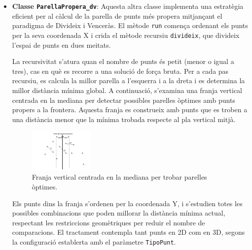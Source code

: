 \documentclass{ieeetj}
\begin{document}
\begin{itemize}
\item \textbf{Classe \texttt{ParellaPropera\_dv}}: Aquesta altra classe implementa una estratègia eficient per al càlcul de la parella de punts més propera mitjançant el paradigma de Divideix i Venceràs. El mètode \texttt{run} comença ordenant els punts per la seva coordenada X i crida el mètode recursiu \texttt{divideix}, que divideix l'espai de punts en dues meitats. 

La recursivitat s'atura quan el nombre de punts és petit (menor o igual a tres), cas en què es recorre a una solució de força bruta. Per a cada pas recursiu, es calcula la millor parella a l'esquerra i a la dreta i es determina la millor distància mínima global. A continuació, s'examina una franja vertical centrada en la mediana per detectar possibles parelles òptimes amb punts propers a la frontera. Aquesta franja es construeix amb punts que es troben a una distància menor que la mínima trobada respecte al pla vertical mitjà.

\begin{figure}[htbp]
    \centerline{\includegraphics[width=0.3\textwidth]{docs/png/distMin.jpg}}
    \caption{Franja vertical centrada en la mediana per trobar parelles òptimes.}
    \label{fig:distMin}
\end{figure}

Els punts dins la franja s'ordenen per la coordenada Y, i s'estudien totes les possibles combinacions que poden millorar la distància mínima actual, respectant les restriccions geomètriques per reduir el nombre de comparacions. El tractament contempla tant punts en 2D com en 3D, segons la configuració establerta amb el paràmetre \texttt{TipoPunt}.
\end{itemize}
\end{document}
